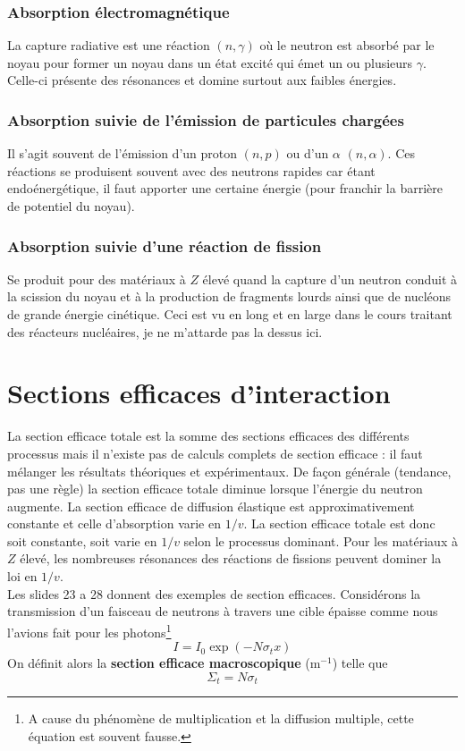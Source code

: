 \subsubsection{Absorption électromagnétique}
La capture radiative est une réaction $(n,\gamma)$ où le neutron est absorbé par le noyau pour former
un noyau dans un état excité qui émet un ou plusieurs $\gamma$. Celle-ci présente des résonances et 
domine surtout aux faibles énergies.

\subsubsection{Absorption suivie de l'émission de particules chargées}
Il s'agit souvent de l'émission d'un proton $(n,p)$ ou d'un $\alpha$ $(n,\alpha)$. Ces réactions
se produisent souvent avec des neutrons rapides car étant endoénergétique, il faut apporter une 
certaine énergie (pour franchir la barrière de potentiel du noyau).

\subsubsection{Absorption suivie d'une réaction de fission}
Se produit pour des matériaux à $Z$ élevé quand la capture d'un neutron conduit à la scission du noyau et à la production de fragments lourds ainsi que de nucléons de grande énergie cinétique. Ceci est
vu en long et en large dans le cours traitant des réacteurs nucléaires, je ne m'attarde pas la dessus
ici.

\section{Sections efficaces d'interaction}%
La section efficace totale est la somme des sections efficaces des différents processus mais il 
n'existe pas de calculs complets de section efficace : il faut mélanger les résultats théoriques
et expérimentaux. De façon générale (tendance, pas une règle) la section efficace totale diminue 
lorsque l'énergie du neutron augmente. La section efficace de diffusion élastique est 
approximativement constante et celle d'absorption varie en $1/v$. La section efficace totale est
donc soit constante, soit varie en $1/v$ selon le processus dominant. Pour les matériaux à $Z$
élevé, les nombreuses résonances des réactions de fissions peuvent dominer la loi en $1/v$.\\

Les slides 23 a 28 donnent des exemples de section efficaces. Considérons la transmission d'un
faisceau de neutrons à travers une cible épaisse comme nous l'avions fait pour les photons\footnote{
A cause du phénomène de multiplication et la diffusion multiple, cette équation est souvent fausse.}
\begin{equation}
I=I_0\exp{(-N\sigma_tx)}
\end{equation}
On définit alors la \textbf{section efficace macroscopique} (m$^{-1}$) telle que
\begin{equation}
\Sigma_t=N\sigma_t
\end{equation}

